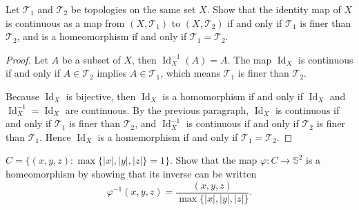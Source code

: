 \begin{exercise}{2.23}
	Let $\mathscr{T}_{1}$ and $\mathscr{T}_{2}$ be topologies on the same set $X$. Show that the identity map of $X$ is continuous as a map from $(X, \mathscr{T}_{1})$ to $(X, \mathscr{T}_{2})$ if and only if $\mathscr{T}_{1}$ is finer than $\mathscr{T}_{2}$, and is a homeomorphism if and only if $\mathscr{T}_{1} = \mathscr{T}_{2}$.
\end{exercise}

\begin{proof}
	Let $A$ be a subset of $X$, then $\operatorname{Id}_{X}^{-1}(A) = A$. The map $\operatorname{Id}_{X}$ is continuous if and only if $A\in\mathscr{T}_{2}$ implies $A\in\mathscr{T}_{1}$, which means $\mathscr{T}_{1}$ is finer than $\mathscr{T}_{2}$.

	Because $\operatorname{Id}_{X}$ is bijective, then $\operatorname{Id}_{X}$ is a homomorphism if and only if $\operatorname{Id}_{X}$ and $\operatorname{Id}_{X}^{-1} = \operatorname{Id}_{X}$ are continuous. By the previous paragraph, $\operatorname{Id}_{X}$ is continuous if and only if $\mathscr{T}_{1}$ is finer than $\mathscr{T}_{2}$, and $\operatorname{Id}_{X}^{-1}$ is continuous if and only if $\mathscr{T}_{2}$ is finer than $\mathscr{T}_{1}$. Hence $\operatorname{Id}_{X}$ is a homemorphism if and only if $\mathscr{T}_{1} = \mathscr{T}_{2}$.
\end{proof}

\begin{exercise}{2.27}
	$C = \{ (x, y, z) : \max\{ \left\vert{x}\right\vert, \left\vert{y}\right\vert, \left\vert{z}\right\vert \} = 1 \}$. Show that the map $\varphi: C\to \mathbb{S}^{2}$ is a homeomorphism by showing that its inverse can be written
	\[
		\varphi^{-1}(x, y, z) = \frac{(x, y, z)}{\max\{
			\left\vert{x}\right\vert, \left\vert{y}\right\vert, \left\vert{z}\right\vert \}}.
	\]
\end{exercise}

